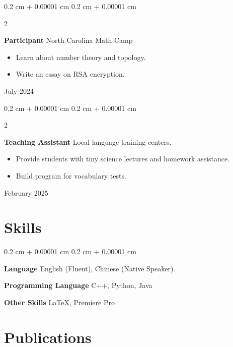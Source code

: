 \documentclass[10pt, letterpaper]{article}
\newenvironment{highlights}{
    \begin{itemize}[
        topsep=0.10 cm,
        parsep=0.10 cm,
        partopsep=0pt,
        itemsep=0pt,
        leftmargin=0.4 cm + 10pt
    ]
}{
    \end{itemize}
} %
\newenvironment{onecolentry}{
    \begin{adjustwidth}{
        0.2 cm + 0.00001 cm
    }{
        0.2 cm + 0.00001 cm
    }
}{
    \end{adjustwidth}
} %
\newenvironment{twocolentry}[2][]{
    \onecolentry
    \def\secondColumn{#2}
    \setcolumnwidth{\fill, 4.5 cm}
    \begin{paracol}{2}
}{
    \switchcolumn \raggedleft \secondColumn
    \end{paracol}
    \endonecolentry
} %
\begin{document}
        \begin{twocolentry}{ July 2024 }
            \textbf{Participant} North Carolina Math Camp

            \begin{highlights}
                \item Learn about number theory and topology.
                \item Write an essay on RSA encryption.
            \end{highlights}
        \end{twocolentry}

        

        \begin{twocolentry}{ February 2025 }
            \textbf{Teaching Assistant} Local language training centers.

            \begin{highlights}
                \item Provide students with tiny science lectures and homework assistance.
                \item Build program for vocabulary tests.
            \end{highlights}
        \end{twocolentry}
    \section{Skills}

    \begin{onecolentry}

        \textbf{Language}  English (Fluent), Chinese (Native Speaker).

        \vspace{5pt}

        \textbf{Programming Language} C++, Python, Java

        \vspace{5pt}

        \textbf{Other Skills} \LaTeX, Premiere Pro
    \end{onecolentry}

        

    \section{Publications}
        
\end{document}
